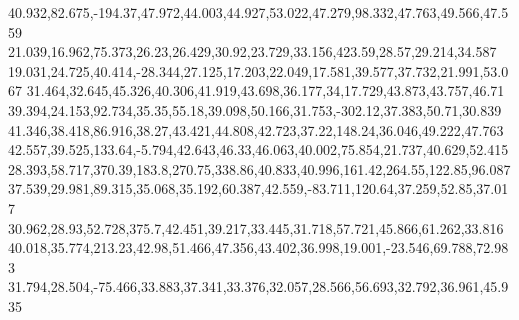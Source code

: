 40.932,82.675,-194.37,47.972,44.003,44.927,53.022,47.279,98.332,47.763,49.566,47.559
21.039,16.962,75.373,26.23,26.429,30.92,23.729,33.156,423.59,28.57,29.214,34.587
19.031,24.725,40.414,-28.344,27.125,17.203,22.049,17.581,39.577,37.732,21.991,53.067
31.464,32.645,45.326,40.306,41.919,43.698,36.177,34,17.729,43.873,43.757,46.71
39.394,24.153,92.734,35.35,55.18,39.098,50.166,31.753,-302.12,37.383,50.71,30.839
41.346,38.418,86.916,38.27,43.421,44.808,42.723,37.22,148.24,36.046,49.222,47.763
42.557,39.525,133.64,-5.794,42.643,46.33,46.063,40.002,75.854,21.737,40.629,52.415
28.393,58.717,370.39,183.8,270.75,338.86,40.833,40.996,161.42,264.55,122.85,96.087
37.539,29.981,89.315,35.068,35.192,60.387,42.559,-83.711,120.64,37.259,52.85,37.017
30.962,28.93,52.728,375.7,42.451,39.217,33.445,31.718,57.721,45.866,61.262,33.816
40.018,35.774,213.23,42.98,51.466,47.356,43.402,36.998,19.001,-23.546,69.788,72.983
31.794,28.504,-75.466,33.883,37.341,33.376,32.057,28.566,56.693,32.792,36.961,45.935
